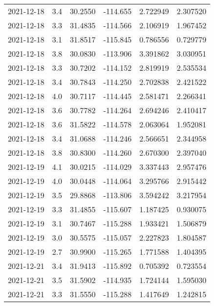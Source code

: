 \begin{tabular}{lrrrrr}
2021-12-18 &       3.4 &  30.2550 &  -114.655 &         2.722949 &         2.307520 \\
2021-12-18 &       3.3 &  31.4835 &  -114.566 &         2.106919 &         1.967452 \\
2021-12-18 &       3.1 &  31.8517 &  -115.845 &         0.786556 &         0.729779 \\
2021-12-18 &       3.8 &  30.0830 &  -113.906 &         3.391862 &         3.030951 \\
2021-12-18 &       3.3 &  30.7202 &  -114.152 &         2.819919 &         2.535534 \\
2021-12-18 &       3.4 &  30.7843 &  -114.250 &         2.702838 &         2.421522 \\
2021-12-18 &       4.0 &  30.7117 &  -114.445 &         2.581471 &         2.266341 \\
2021-12-18 &       3.6 &  30.7782 &  -114.264 &         2.694246 &         2.410417 \\
2021-12-18 &       3.6 &  31.5822 &  -114.578 &         2.063064 &         1.952081 \\
2021-12-18 &       3.4 &  31.0688 &  -114.246 &         2.566651 &         2.344958 \\
2021-12-18 &       3.8 &  30.8300 &  -114.260 &         2.670300 &         2.397040 \\
2021-12-19 &       4.1 &  30.0215 &  -114.029 &         3.337443 &         2.957476 \\
2021-12-19 &       4.0 &  30.0448 &  -114.064 &         3.295766 &         2.915442 \\
2021-12-19 &       3.5 &  29.8868 &  -113.806 &         3.594242 &         3.217954 \\
2021-12-19 &       3.3 &  31.4855 &  -115.607 &         1.187425 &         0.930075 \\
2021-12-19 &       3.1 &  30.7467 &  -115.288 &         1.933421 &         1.506879 \\
2021-12-19 &       3.0 &  30.5575 &  -115.057 &         2.227823 &         1.804587 \\
2021-12-19 &       2.7 &  30.9900 &  -115.265 &         1.771588 &         1.404395 \\
2021-12-21 &       3.4 &  31.9413 &  -115.892 &         0.705392 &         0.723554 \\
2021-12-21 &       3.5 &  31.5902 &  -114.935 &         1.724144 &         1.595030 \\
2021-12-21 &       3.3 &  31.5550 &  -115.288 &         1.417649 &         1.242815 \\

\end{tabular}
